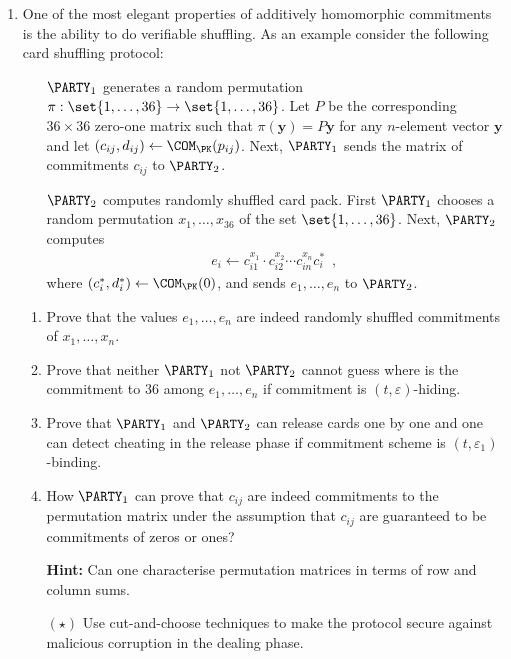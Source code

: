 \documentclass{article}
\renewcommand{\vec}[1]{\boldsymbol{#1}}
\begin{document}
\begin{enumerate}
  \item One of the most elegant properties of additively homomorphic
    commitments is the ability to do verifiable shuffling.  As an
    example consider the following card shuffling protocol:
    \begin{enumerate}
    \item[$\PARTY_1$] generates a random permutation
      $\pi:\set{1,\ldots,36}\to\set{1,\ldots,36}$. Let $P$ be the
      corresponding $36\times 36$ zero-one matrix such that
      $\pi(\vec{y})=P\vec{y}$ for any $n$-element vector $\vec{y}$ and
      let $(c_{ij},d_{ij})\gets\COM_\PK(p_{ij})$. Next, $\PARTY_1$
      sends the matrix of commitments $c_{ij}$ to $\PARTY_2$.
    \item[$\PARTY_2$] computes randomly shuffled card pack. First
      $\PARTY_1$ chooses a random permutation $x_1,\ldots,x_{36}$ of
      the set $\set{1,\ldots,36}$. Next, $\PARTY_2$ computes
      \begin{align*}
        e_i\gets c_{i1}^{x_1}\cdot c_{i2}^{x_2}\cdots c_{in}^{x_n} c_i^*\enspace,
      \end{align*}
      where $(c_i^*,d_i^*)\gets\COM_\PK(0)$, and sends
      $e_1,\ldots,e_n$ to $\PARTY_2$.
    \end{enumerate}
   \begin{enumerate}
   \item Prove that the values $e_1,\ldots, e_n$ are indeed randomly
     shuffled commitments of $x_1,\ldots, x_n$.
   \item Prove that neither $\PARTY_1$ not $\PARTY_2$ cannot guess
     where is the commitment to $36$ among $e_1,\ldots,e_n$ if
     commitment is $(t,\varepsilon)$-hiding.
   \item Prove that $\PARTY_1$ and $\PARTY_2$ can release cards one by
     one and one can detect cheating in the release phase if
     commitment scheme is $(t,\varepsilon_1)$-binding.
   \item How $\PARTY_1$ can prove that $c_{ij}$ are indeed commitments
     to the permutation matrix under the assumption that $c_{ij}$ are
     guaranteed to be commitments of zeros or ones?
    
     \textbf{Hint:} Can one characterise permutation matrices in terms
     of row and column sums.
   \item[$(\star)$] Use cut-and-choose techniques to make the protocol
     secure against malicious corruption in the dealing phase.

   \end{enumerate}


\end{enumerate}
\end{document}

